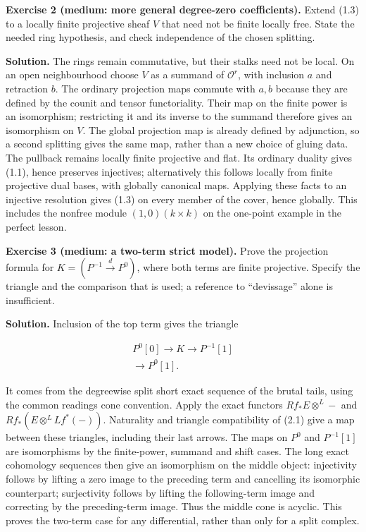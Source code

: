 \documentclass[
  english,
  11pt,
  a4paper,
]{article}
\begin{document}
\textbf{Exercise 2 (medium: more general degree-zero coefficients).}
Extend (1.3) to a locally finite projective sheaf \(V\) that need not be
finite locally free. State the needed ring hypothesis, and check
independence of the chosen splitting.

\textbf{Solution.} The rings remain commutative, but their stalks need
not be local. On an open neighbourhood choose \(V\) as a summand of
\(\mathcal O^r\), with inclusion \(a\) and retraction \(b\). The
ordinary projection maps commute with \(a,b\) because they are defined
by the counit and tensor functoriality. Their map on the finite power is
an isomorphism; restricting it and its inverse to the summand therefore
gives an isomorphism on \(V\). The global projection map is already
defined by adjunction, so a second splitting gives the same map, rather
than a new choice of gluing data. The pullback remains locally finite
projective and flat. Its ordinary duality gives (1.1), hence preserves
injectives; alternatively this follows locally from finite projective
dual bases, with globally canonical maps. Applying these facts to an
injective resolution gives (1.3) on every member of the cover, hence
globally. This includes the nonfree module \((1,0)(k\times k)\) on the
one-point example in the perfect lesson.

\textbf{Exercise 3 (medium: a two-term strict model).} Prove the
projection formula for \(K=(P^{-1}\xrightarrow dP^0)\), where both terms
are finite projective. Specify the triangle and the comparison that is
used; a reference to ``devissage'' alone is insufficient.

\textbf{Solution.} Inclusion of the top term gives the triangle

\[\begin{gathered}
P^0[0]\longrightarrow K\longrightarrow P^{-1}[1]\\
\longrightarrow P^0[1].
\end{gathered}
\tag{6.1}\]

It comes from the degreewise split short exact sequence of the brutal
tails, using the common reading\textquotesingle s cone convention. Apply
the exact functors \(Rf_*E\otimes^L-\) and \(Rf_*(E\otimes^L Lf^*(-))\).
Naturality and triangle compatibility of (2.1) give a map between these
triangles, including their last arrows. The maps on \(P^0\) and
\(P^{-1}[1]\) are isomorphisms by the finite-power, summand and shift
cases. The long exact cohomology sequences then give an isomorphism on
the middle object: injectivity follows by lifting a zero image to the
preceding term and cancelling its isomorphic counterpart; surjectivity
follows by lifting the following-term image and correcting by the
preceding-term image. Thus the middle cone is acyclic. This proves the
two-term case for any differential, rather than only for a split
complex.
\end{document}
